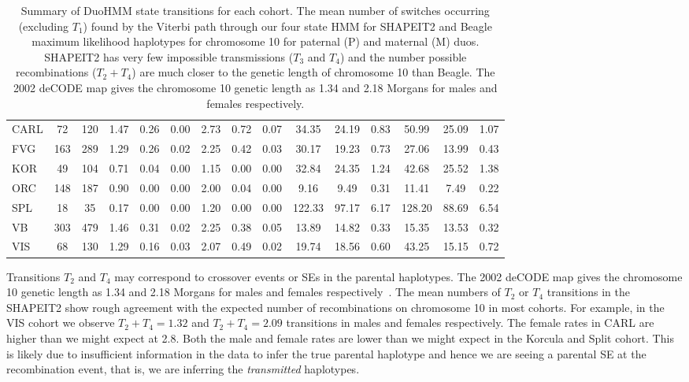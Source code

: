 \begin{table}
\begin{center}
{\begin{tabular}{|l|cc||ccc|ccc||ccc|ccc|}
  CARL & 72 & 120 & 1.47 & 0.26 & 0.00 & 2.73 & 0.72 & 0.07 & 34.35 & 24.19 & 0.83 & 50.99 & 25.09 & 1.07 \\ 
  FVG & 163 & 289 & 1.29 & 0.26 & 0.02 & 2.25 & 0.42 & 0.03 & 30.17 & 19.23 & 0.73 & 27.06 & 13.99 & 0.43 \\ 
  KOR & 49 & 104 & 0.71 & 0.04 & 0.00 & 1.15 & 0.00 & 0.00 & 32.84 & 24.35 & 1.24 & 42.68 & 25.52 & 1.38 \\ 
  ORC & 148 & 187 & 0.90 & 0.00 & 0.00 & 2.00 & 0.04 & 0.00 & 9.16 & 9.49 & 0.31 & 11.41 & 7.49 & 0.22 \\ 
  SPL & 18 & 35 & 0.17 & 0.00 & 0.00 & 1.20 & 0.00 & 0.00 & 122.33 & 97.17 & 6.17 & 128.20 & 88.69 & 6.54 \\ 
  VB & 303 & 479 & 1.46 & 0.31 & 0.02 & 2.25 & 0.38 & 0.05 & 13.89 & 14.82 & 0.33 & 15.35 & 13.53 & 0.32 \\ 
  VIS & 68 & 130 & 1.29 & 0.16 & 0.03 & 2.07 & 0.49 & 0.02 & 19.74 & 18.56 & 0.60 & 43.25 & 15.15 & 0.72 \\ 
  \hline
\end{tabular}
}
\end{center}
\caption[Summary of DuoHMM state transitions for each cohort]{Summary of DuoHMM state transitions for each cohort. The mean number of switches occurring (excluding $T_1$)  found by the Viterbi path through our four state HMM for SHAPEIT2 and Beagle maximum likelihood haplotypes for chromosome 10 for paternal (P) and maternal (M) duos.  SHAPEIT2 has very few impossible transmissions ($T_3$ and $T_4$) and the number possible recombinations ($T_2 + T_4$) are much closer to the genetic length of chromosome 10 than Beagle.  The 2002 deCODE map gives the chromosome 10 genetic  length as 1.34 and 2.18 Morgans for males and females respectively. \label{tab:pedtab1}}
\end{table}

Transitions $T_2$ and $T_4$ may correspond to crossover events or SEs in the parental haplotypes. The 2002 deCODE map gives the chromosome 10 genetic length as 1.34 and 2.18 Morgans for males and females respectively~\citep{kong2002}. The mean numbers of $T_2$ or $T_4$ transitions in the SHAPEIT2 show rough agreement with the expected number of recombinations on chromosome 10 in most cohorts.  For example, in the VIS cohort we observe $T_2+T_4=1.32$ and $T_2+T_4=2.09$ transitions in males and females respectively. The female rates in CARL are higher than we might expect at 2.8. Both the male and female rates are lower than we might expect in the Korcula and Split cohort.  This is likely due to insufficient information in the data to infer the true parental haplotype and hence we are seeing a parental SE at the recombination event, that is, we are inferring the \emph{transmitted} haplotypes.

